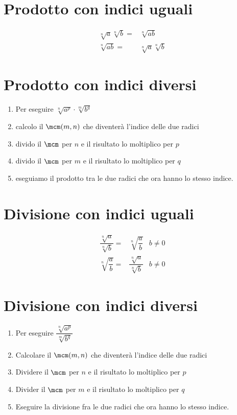 \section{Prodotto con indici uguali}
\begin{align*}
\sqrt[n]{a}\sqrt[n]{b}=&\sqrt[n]{ab}\\
\sqrt[n]{ab}=&\sqrt[n]{a}\sqrt[n]{b}
\end{align*}
\section{Prodotto con indici diversi}
\begin{enumerate}
	\item Per eseguire $\sqrt[n]{a^p}\cdot\sqrt[m]{b^q}$
	\item calcolo il $\mcm(m,n)$ che diventerà l'indice  delle due radici
	\item divido il  $\mcm$ per $n$ e il risultato lo moltiplico per $p$
	\item divido il  $\mcm$ per $m$ e il risultato lo moltiplico per $q$
	\item eseguiamo  il prodotto tra le due radici che ora hanno lo stesso indice.
\end{enumerate}
\section{Divisione con indici uguali}
\begin{align*}
\dfrac{\sqrt[n]{a}}{\sqrt[n]{b}}=&\sqrt[n]{\dfrac{a}{b}}&b\neq 0\\
\sqrt[n]{\dfrac{a}{b}}=&\dfrac{\sqrt[n]{a}}{\sqrt[n]{b}}&b\neq 0
\end{align*}
\section{Divisione con indici diversi}
\begin{enumerate}
	\item Per eseguire
	$\dfrac{\sqrt[n]{a^p}}{\sqrt[m]{b^q}}$
	\item Calcolare il $\mcm(m,n)$ che diventerà l'indice  delle due radici
	\item Dividere il  $\mcm$ per $n$ e il risultato lo moltiplico per $p$
	\item Divider il  $\mcm$ per $m$ e il risultato lo moltiplico per $q$
	\item Eseguire la divisione fra le due radici che ora hanno lo stesso indice.
\end{enumerate}
